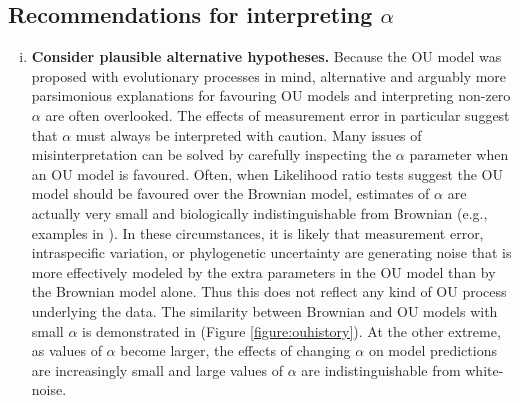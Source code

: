 \documentclass[a4paper,12pt]{article}
\begin{document}
  \subsection{Recommendations for interpreting $\alpha$}    
    \begin{enumerate}[(i)]
    \item \textbf{Consider plausible alternative hypotheses.}
    Because the OU model was proposed with evolutionary processes in mind, alternative and arguably more parsimonious explanations for favouring OU models and interpreting non-zero $\alpha$ are often overlooked. 
    The effects of measurement error in particular suggest that $\alpha$ must always be interpreted with caution. 
    Many issues of misinterpretation can be solved by carefully inspecting the $\alpha$ parameter when an OU model is favoured. 
    Often, when Likelihood ratio tests suggest the OU model should be favoured over the Brownian model, estimates of $\alpha$ are actually very small and biologically indistinguishable from Brownian (e.g., examples in \citealp{Harmon:2010aa}).
    In these circumstances, it is likely that measurement error, intraspecific variation, or phylogenetic uncertainty are generating noise that is more effectively modeled by the extra parameters in the OU model than by the Brownian model alone. 
    Thus this does not reflect any kind of OU process underlying the data. 
    The similarity between Brownian and OU models with small $\alpha$ is demonstrated in (Figure \ref{figure:ouhistory}). 
    At the other extreme, as values of $\alpha$ become larger, the effects of changing $\alpha$ on model predictions are increasingly small and large values of $\alpha$ are indistinguishable from white-noise. 
    

\end{enumerate}
\end{document}
